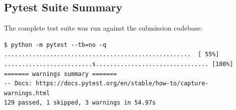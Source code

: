 \documentclass[12pt,a4paper]{article}
\begin{document}
\subsection{Pytest Suite Summary}

The complete test suite was run against the submission codebase:

\begin{lstlisting}[caption={Pytest execution result (from \texttt{tests/} directory).},
                   label={lst:pytest}]
$ python -m pytest --tb=no -q
.....................................................  [ 55%]
.........................s................................ [100%]
======= warnings summary =======
-- Docs: https://docs.pytest.org/en/stable/how-to/capture-warnings.html
129 passed, 1 skipped, 3 warnings in 54.97s
\end{lstlisting}
\end{document}

